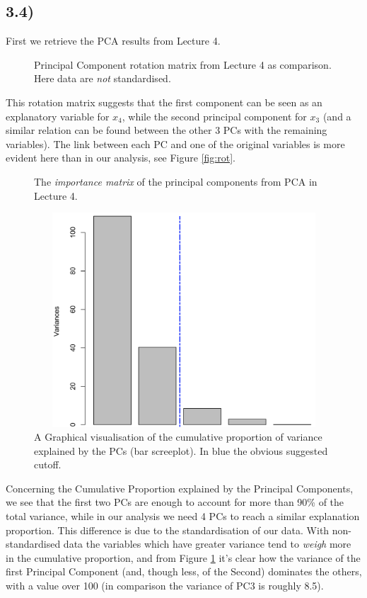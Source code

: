 \documentclass[a4paper,11pt,oneside]{report}
\begin{document}
\subsection*{3.4)}
	First we retrieve the PCA results from Lecture 4.
	\begin{figure}[H]
	\centering
	\begin{varwidth}{\linewidth}
	
	\end{varwidth}	\caption{Principal Component rotation matrix from Lecture 4 as comparison. Here data are \textit{not} standardised.}
	\end{figure}
	This rotation matrix suggests that the first component can be seen as an explanatory variable for $x_4$, while the second principal component for $x_3$ (and a similar relation can be found between the other 3 PCs with the remaining variables). The link between each PC and one of the original variables is more evident here than in our analysis, see Figure \ref{fig:rot}.
	\begin{figure}[H]
	\centering
	\begin{varwidth}{\linewidth}
	
	\end{varwidth}
	\caption{The \textit{importance matrix} of the principal components from PCA in Lecture 4.}
	\label{img:importance_4}
	\end{figure}
	\begin{figure}[H]
	\centering
	\includegraphics[height = 8cm, width = 13cm]{screeplot_bar_De_Blasi.png}
	\caption{A Graphical visualisation of the cumulative proportion of variance explained by the PCs (bar screeplot). In blue the obvious suggested cutoff.}
	\end{figure}
	
	Concerning the Cumulative Proportion explained by the Principal Components, we see that the first two PCs are enough to account for more than 90\% of the total variance, while in our analysis we need 4 PCs to reach a similar explanation proportion.
	This difference is due to the standardisation of our data. With non-standardised data the variables which have greater variance tend to \textit{weigh} more in the cumulative proportion, and from Figure \ref{img:importance_4} it's clear how the variance of the first Principal Component (and, though less, of the Second) dominates the others, with a value over 100 (in comparison the variance of PC3 is roughly 8.5).

	
\end{document}
